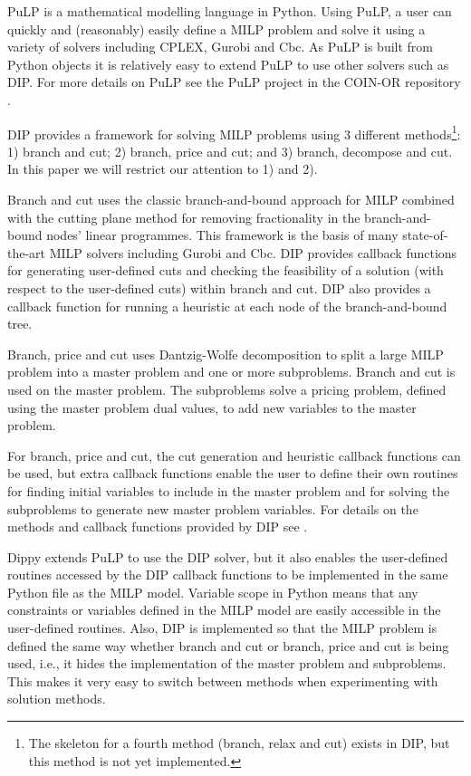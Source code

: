 PuLP is a mathematical modelling language in Python. Using PuLP, a user can quickly and (reasonably) easily define a \ac{MILP} problem and solve it using a variety of solvers including CPLEX, Gurobi and Cbc. As PuLP is built from Python objects it is relatively easy to extend PuLP to use other solvers such as \ac{DIP}. For more details on PuLP see the PuLP project in the COIN-OR repository \cite{coin_or}.

\acf{DIP} \cite{decomp04} provides a framework for solving \ac{MILP} problems using 3 different methods\footnote{The skeleton for a fourth method (branch, relax and cut) exists in \ac{DIP}, but this method is not yet implemented.}: 1) branch and cut; 2) branch, price and cut; and 3) branch, decompose and cut. In this paper we will restrict our attention to 1) and 2).

Branch and cut uses the classic branch-and-bound approach for \ac{MILP} combined with the cutting plane method for removing fractionality in the branch-and-bound nodes' linear programmes. This framework is the basis of many state-of-the-art \ac{MILP} solvers including Gurobi and Cbc. \ac{DIP} provides callback functions for generating user-defined cuts and checking the feasibility of a solution (with respect to the user-defined cuts) within branch and cut. \ac{DIP} also provides a callback function for running a heuristic at each node of the branch-and-bound tree.

Branch, price and cut uses Dantzig-Wolfe decomposition to split a large \ac{MILP} problem into a master problem and one or more subproblems. Branch and cut is used on the master problem. The subproblems solve a pricing problem, defined using the master problem dual values, to add new variables to the master problem.

For branch, price and cut, the cut generation and heuristic callback functions can be used, but extra callback functions enable the user to define their own routines for finding initial variables to include in the master problem and for solving the subproblems to generate new master problem variables. For details on the methods and callback functions provided by \ac{DIP} see \cite{decomp04}.

Dippy extends PuLP to use the \ac{DIP} solver, but it also enables the user-defined routines accessed by the \ac{DIP} callback functions to be implemented in the same Python file as the \ac{MILP} model. Variable scope in Python means that any constraints or variables defined in the \ac{MILP} model are easily accessible in the user-defined routines. Also, \ac{DIP} is implemented so that the \ac{MILP} problem is defined the same way whether branch and cut or branch, price and cut is being used, i.e., it hides the implementation of the master problem and subproblems. This makes it very easy to switch between methods when experimenting with solution methods.


